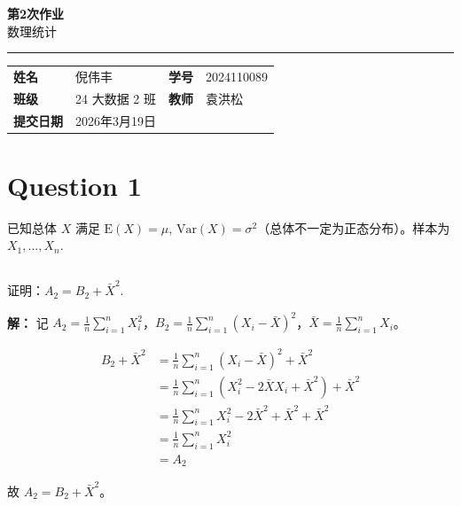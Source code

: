 \documentclass[12pt,a4paper]{article}
\newcommand{\course}{数理统计}
\newcommand{\homeworktitle}{第2次作业}
\newcommand{\studentname}{倪伟丰}
\newcommand{\studentid}{2024110089}
\newcommand{\classname}{24 大数据 2 班}
\newcommand{\teacher}{袁洪松}
\newcommand{\duedate}{2026年3月19日}
\begin{document}
\begin{center}
  {\Huge\bfseries\color{mainblue}\homeworktitle}\\[0.6em]
  {\Large\course}\\[1.2em]
  {\color{linegray}\rule{0.9\textwidth}{0.8pt}}
\end{center}

\begin{infobox}
\begin{tabularx}{\textwidth}{>{\bfseries}p{2.2cm} X >{\bfseries}p{2.2cm} X}
姓名 & \studentname & 学号 & \studentid \\
班级 & \classname & 教师 & \teacher \\
提交日期 & \duedate &  &  \\
\end{tabularx}
\end{infobox}



\section{Question 1}

已知总体 $X$ 满足 $\mathrm{E}(X)=\mu$, $\mathrm{Var}(X)=\sigma^2$（总体不一定为正态分布）。样本为 $X_1,\ldots,X_n$.

\subsection{}

证明：$A_2 = B_2 + \bar{X}^{2}$.

\begin{answerbox}
\textbf{解：}
  记 $A_2=\frac{1}{n}\sum_{i=1}^n X_i^2$，$B_2=\frac{1}{n}\sum_{i=1}^n(X_i-\bar{X})^2$，$\bar{X}=\frac{1}{n}\sum_{i=1}^n X_i$。

  \begin{align*}
    B_2 + \bar{X}^2 &= \frac{1}{n}\sum_{i=1}^n(X_i-\bar{X})^2 + \bar{X}^2 \\
    &= \frac{1}{n}\sum_{i=1}^n(X_i^2 - 2\bar{X} X_i + \bar{X}^2) + \bar{X}^2 \\
    &= \frac{1}{n}\sum_{i=1}^n X_i^2 - 2\bar{X}^2 + \bar{X}^2 + \bar{X}^2 \\
    &= \frac{1}{n}\sum_{i=1}^n X_i^2 \\
    &= A_2
  \end{align*}

  故 $A_2 = B_2 + \bar{X}^{2}$。
\end{answerbox}

\subsection{}
\end{document}
